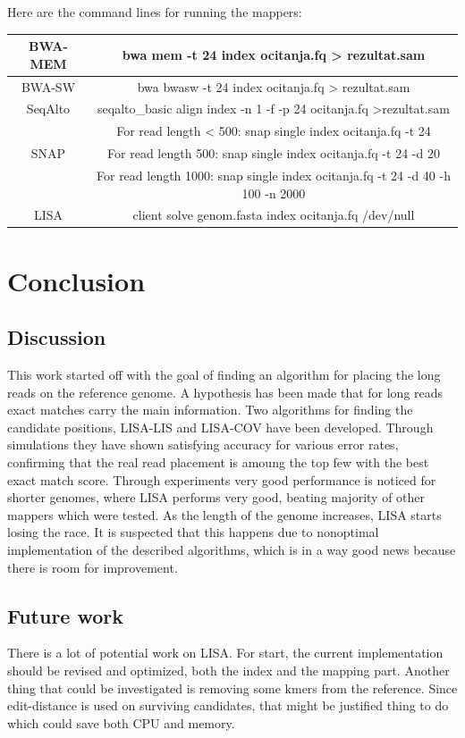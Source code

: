 \documentclass[times, utf8, diplomski]{fer}
\begin{document}
Here are the command lines for running the mappers:
\begin{table}[H]
\centering
\begin{tabular}{|c|c|}
\hline
BWA-MEM & bwa mem -t 24 index ocitanja.fq > rezultat.sam\\
\hline
BWA-SW & bwa bwasw -t 24 index ocitanja.fq > rezultat.sam\\
\hline
SeqAlto & seqalto\_basic align index -n 1 -f -p 24 ocitanja.fq >rezultat.sam\\
\hline
 & For read length < 500: snap single index ocitanja.fq -t 24\\
SNAP & For read length 500: snap single index ocitanja.fq -t 24 -d 20\\
& For read length 1000: snap single index ocitanja.fq -t 24 -d 40 -h 100 -n 2000\\
\hline
LISA & client solve genom.fasta index ocitanja.fq /dev/null\\
\hline
\end{tabular}
\label{komande}
\end{table}


\chapter{Conclusion}
\section {Discussion}
This work started off with the goal of finding an algorithm for placing the long reads on the reference genome. A hypothesis has been made that for long reads exact matches carry the main information. Two algorithms for finding the candidate positions, LISA-LIS and LISA-COV have been developed. Through simulations they have shown satisfying accuracy for various error rates, confirming that the real read placement is amoung the top few with the best exact match score. Through experiments very good performance is noticed for shorter genomes, where LISA performs very good, beating majority of other mappers which were tested. As the length of the genome increases, LISA starts losing the race. It is suspected that this happens due to nonoptimal implementation of the described algorithms, which is in a way good news because there is room for improvement.

\section {Future work}
There is a lot of potential work on LISA. For start, the current implementation should be revised and optimized, both the index and the mapping part. Another thing that could be investigated is removing some kmers from the reference. Since edit-distance is used on surviving candidates, that might be justified thing to do which could save both CPU and memory.
\end{document}
